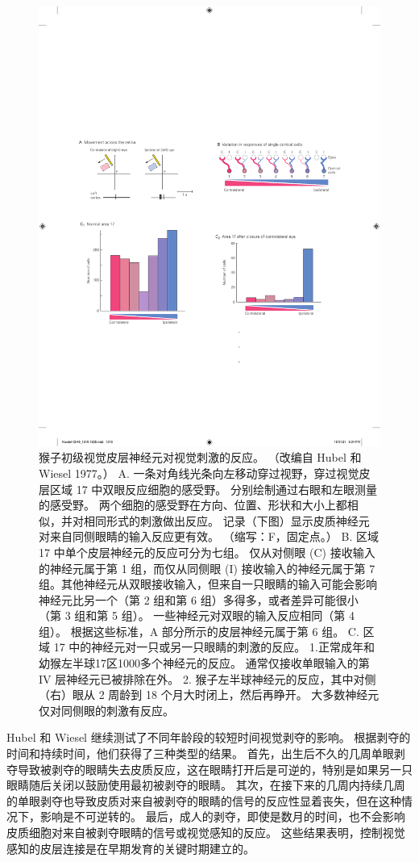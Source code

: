 \begin{figure}[htbp]
	\centering
	\includegraphics[width=0.5\linewidth]{chap49/fig_49_3}
	\caption{猴子初级视觉皮层神经元对视觉刺激的反应。 （改编自 Hubel 和 Wiesel 1977。） A. 一条对角线光条向左移动穿过视野，穿过视觉皮层区域 17 中双眼反应细胞的感受野。 分别绘制通过右眼和左眼测量的感受野。 两个细胞的感受野在方向、位置、形状和大小上都相似，并对相同形式的刺激做出反应。 记录（下图）显示皮质神经元对来自同侧眼睛的输入反应更有效。 （缩写：F，固定点。） B. 区域 17 中单个皮层神经元的反应可分为七组。 仅从对侧眼 (C) 接收输入的神经元属于第 1 组，而仅从同侧眼 (I) 接收输入的神经元属于第 7 组。其他神经元从双眼接收输入，但来自一只眼睛的输入可能会影响 神经元比另一个（第 2 组和第 6 组）多得多，或者差异可能很小（第 3 组和第 5 组）。 一些神经元对双眼的输入反应相同（第 4 组）。 根据这些标准，A 部分所示的皮层神经元属于第 6 组。 C. 区域 17 中的神经元对一只或另一只眼睛的刺激的反应。 1.正常成年和幼猴左半球17区1000多个神经元的反应。 通常仅接收单眼输入的第 IV 层神经元已被排除在外。 2. 猴子左半球神经元的反应，其中对侧（右）眼从 2 周龄到 18 个月大时闭上，然后再睁开。 大多数神经元仅对同侧眼的刺激有反应。}
	\label{fig:49_3}
\end{figure}

Hubel 和 Wiesel 继续测试了不同年龄段的较短时间视觉剥夺的影响。 根据剥夺的时间和持续时间，他们获得了三种类型的结果。 首先，出生后不久的几周单眼剥夺导致被剥夺的眼睛失去皮质反应，这在眼睛打开后是可逆的，特别是如果另一只眼睛随后关闭以鼓励使用最初被剥夺的眼睛。 其次，在接下来的几周内持续几周的单眼剥夺也导致皮质对来自被剥夺的眼睛的信号的反应性显着丧失，但在这种情况下，影响是不可逆转的。 最后，成人的剥夺，即使是数月的时间，也不会影响皮质细胞对来自被剥夺眼睛的信号或视觉感知的反应。 这些结果表明，控制视觉感知的皮层连接是在早期发育的关键时期建立的。

